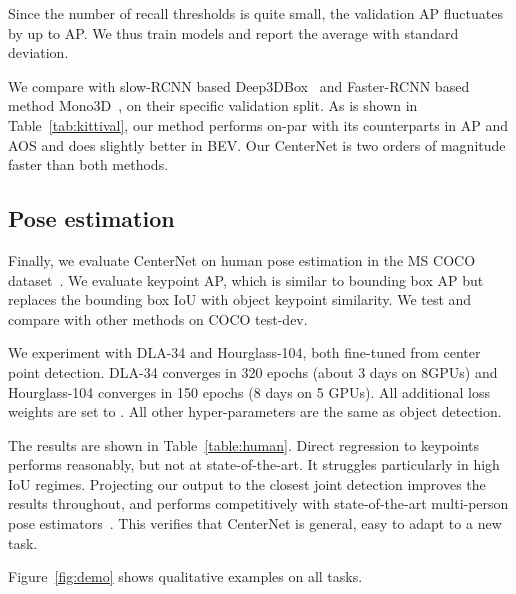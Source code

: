 \documentclass[10pt,twocolumn,letterpaper]{article}
\begin{document}
Since the number of recall thresholds is quite small, the validation AP fluctuates by up to  AP.
We thus train  models and report the average with standard deviation.

We compare with slow-RCNN based Deep3DBox~\cite{mousavian20173d} and Faster-RCNN based method Mono3D~\cite{chen2016monocular}, on their specific validation split.
As is shown in Table~\ref{tab:kittival}, our method performs on-par with its counterparts in AP and AOS and does slightly better in BEV.
Our CenterNet is two orders of magnitude faster than both methods.

\subsection{Pose estimation}

Finally, we evaluate CenterNet on human pose estimation in the MS COCO dataset~\cite{lin2014microsoft}.
We evaluate keypoint AP, which is similar to bounding box AP but replaces the bounding box IoU with object keypoint similarity.
We test and compare with other methods on COCO test-dev.

We experiment with DLA-34 and Hourglass-104, both fine-tuned from center point detection.
DLA-34 converges in 320 epochs (about 3 days on 8GPUs) and Hourglass-104 converges in 150 epochs (8 days on 5 GPUs).
All additional loss weights are set to .
All other hyper-parameters are the same as object detection.

The results are shown in Table~\ref{table:human}.
Direct regression to keypoints performs reasonably, but not at state-of-the-art.
It struggles particularly in high IoU regimes.
Projecting our output to the closest joint detection improves the results throughout, and performs competitively with state-of-the-art multi-person pose estimators~\cite{cao2017realtime,newell2017associative,he2017mask,papandreou2018personlab}.
This verifies that CenterNet is general, easy to adapt to a new task.

Figure~\ref{fig:demo} shows qualitative examples on all tasks.
\end{document}
